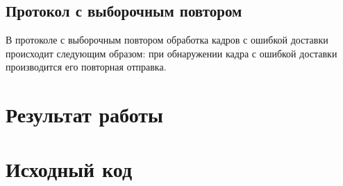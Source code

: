 \documentclass[a4paper,10pt]{article}
\begin{document}
\subsection{Протокол с выборочным повтором}
В протоколе с выборочным повтором обработка кадров с ошибкой доставки происходит следующим образом:
при обнаружении кадра с ошибкой доставки производится его повторная отправка.

\section{Результат работы}

\pagebreak

\appendix
\section{Исходный код}
\label{appendix-sources}

%


\pagebreak



\end{document}
